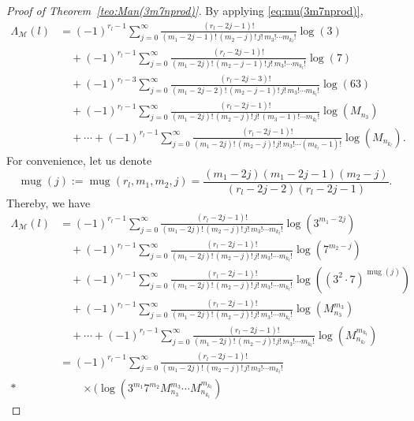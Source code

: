 \documentclass[11pt, a4paper]{article}
\newcommand{\calM}{\mathcal{M}}
\newcommand{\manM}{\Lambda_{\calM}}
\newcommand{\uM}{u_\calM}
\newcommand{\muM}{\mu_\calM}
\newcommand{\mug}{\operatorname{mug}}
\theoremstyle{plain}
\theoremstyle{definition}
\begin{document}
\begin{proof}[Proof of Theorem~\ref{teo:Man(3m7nprod)}]
By applying \eqref{eq:mu(3m7nprod)}, 
\begin{align*}
  \manM(l) %
  &= (-1)^{r_l-1} \sum_{j=0}^{\infty} \frac{(r_l-2j-1)!}{(m_1-2j-1)!\,(m_2-j)!\,j!\,m_3! \cdots m_{k_l}!} \log(3) \\
  &\quad+ (-1)^{r_l-1} \sum_{j=0}^{\infty} \frac{(r_l-2j-1)!}{(m_1-2j)!\,(m_2-j-1)!\,j!\,m_3! \cdots m_{k_l}!} \log(7) \\
  &\quad+ (-1)^{r_l-3} \sum_{j=0}^{\infty} \frac{(r_l-2j-3)!}{(m_1-2j-2)!\,(m_2-j-1)!\,j!\,m_3! \cdots m_{k_l}!} \log(63) \\
  &\quad+ (-1)^{r_l-1} \sum_{j=0}^{\infty} \frac{(r_l-2j-1)!}{(m_1-2j)!\,(m_2-j)!\,j!\,(m_3-1)! \cdots m_{k_l}!} \log(M_{n_3}) \\
  &\quad+ \cdots 
  + (-1)^{r_l-1} \sum_{j=0}^{\infty} \frac{(r_l-2j-1)!}{(m_1-2j)!\,(m_2-j)!\,j!\,m_3! \cdots (m_{k_l}-1)!} \log(M_{n_{k_l}}).
\end{align*}
For convenience, let us denote
\[
  \mug(j) := 
  \mug(r_l,m_1,m_2,j) = \frac{(m_1-2j)(m_1-2j-1)(m_2-j)}{(r_l-2j-2)(r_l-2j-1)}.
\]
Thereby, we have
\begin{align*}
  \manM(l) %
  &= (-1)^{r_l-1} \sum_{j=0}^{\infty} \frac{(r_l-2j-1)!}{(m_1-2j)!\,(m_2-j)!\,j!\,m_3! \cdots m_{k_l}!} 
  \log(3^{m_1-2j}) \\
  &\quad+ (-1)^{r_l-1} \sum_{j=0}^{\infty} \frac{(r_l-2j-1)!}{(m_1-2j)!\,(m_2-j)!\,j!\,m_3! \cdots m_{k_l}!} 
  \log(7^{m_2-j}) \\
  &\quad+ (-1)^{r_l-1} \sum_{j=0}^{\infty} \frac{(r_l-2j-1)!}{(m_1-2j)!\,(m_2-j)!\,j!\,m_3! \cdots m_{k_l}!} 
  \log({(3^2\cdot7)}^{\mug(j)}) \\
  &\quad+ (-1)^{r_l-1} \sum_{j=0}^{\infty} \frac{(r_l-2j-1)!}{(m_1-2j)!\,(m_2-j)!\,j!\,m_3! \cdots m_{k_l}!} 
  \log(M_{n_3}^{m_3}) \\
  &\quad+ \cdots 
  + (-1)^{r_l-1} \sum_{j=0}^{\infty} \frac{(r_l-2j-1)!}{(m_1-2j)!\,(m_2-j)!\,j!\,m_3! \cdots m_{k_l}!} 
  \log(M_{n_{k_l}}^{m_{k_l}}) \\
  &= (-1)^{r_l-1} \sum_{j=0}^{\infty} \frac{(r_l-2j-1)!}{(m_1-2j)!\,(m_2-j)!\,j!\,m_3! \cdots m_{k_l}!} \\*
  &\qquad \times \Big( \log(3^{m_1} 7^{m_2} M_{n_3}^{m_3} \cdots M_{n_{k_l}}^{m_{k_l}})

\end{align*}
\end{proof}
\end{document}
